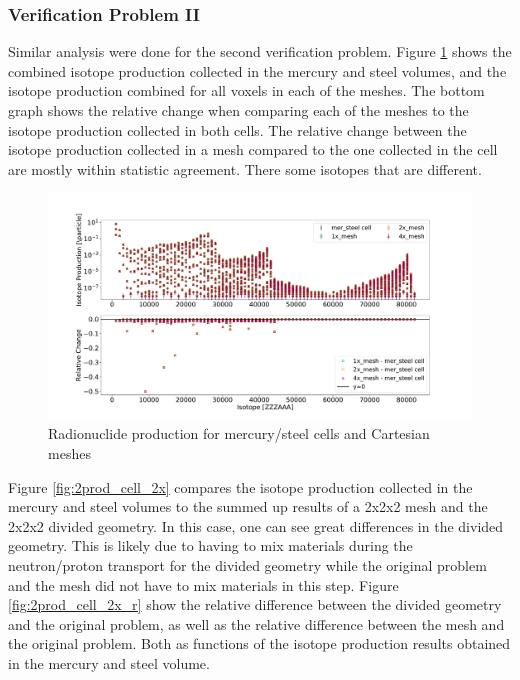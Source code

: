 
\newpage

\subsubsection{Verification Problem II}
Similar analysis were done for the second verification problem. Figure
\ref{fig:2prod_cell_1x_2x_4x} shows the combined isotope production collected
in the mercury and steel volumes, and the isotope production combined for all
voxels in each of the meshes. The bottom graph shows the relative change when
comparing each of the meshes to the isotope production collected in both cells.
The relative change between the isotope production collected in a mesh compared
to the one collected in the cell are mostly within statistic agreement. There
some isotopes that are different.
%
\begin{figure}[H]
 \centering
 \includegraphics[scale=0.42,trim={2cm 1cm 3cm 2cm},clip]{../figs/toy_p2/prod_VPII_1x_2x_4x.pdf}
 \caption{Radionuclide production for mercury/steel cells and Cartesian meshes}
 \label{fig:2prod_cell_1x_2x_4x}
\end{figure}
%
Figure \ref{fig:2prod_cell_2x} compares the isotope production collected in the
mercury and steel volumes to the summed up results of a 2x2x2 mesh and the 2x2x2
divided geometry. In this case, one can see great differences in the divided
geometry. This is likely due to having to mix materials during the
neutron/proton transport for the divided geometry while the original problem
and the mesh did not have to mix materials in this step.
Figure \ref{fig:2prod_cell_2x_r} show the relative difference between the
divided geometry and the original problem, as well as the relative difference
between the mesh and the original problem. Both as functions of the isotope
production results obtained in the mercury and steel volume.
